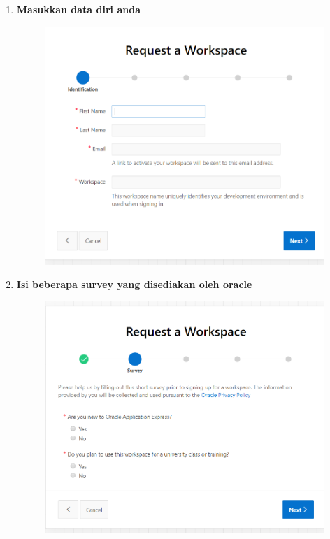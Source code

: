 \begin{enumerate}
\item \textbf{Masukkan data diri anda}
\begin{figure}[H]
    \centering
    \includegraphics[scale=0.3]{figures/3.png}
    \label{3}
\end{figure}


\item \textbf{Isi beberapa survey yang disediakan oleh oracle}\begin{figure}[H]
    \centering
    \includegraphics[scale=0.3]{figures/4.png}
    \label{4}
\end{figure}



\end{enumerate}
